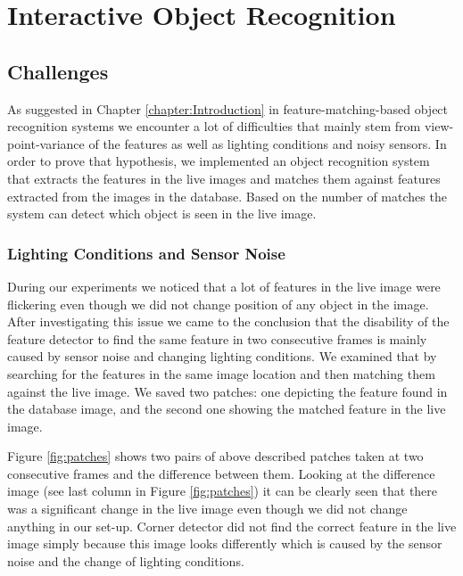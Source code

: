 \chapter{Interactive Object Recognition}
\label{chapter:Object Recognition}

\section{Challenges}
As suggested in Chapter \ref{chapter:Introduction} in feature-matching-based object recognition systems we encounter a lot of difficulties that mainly stem from view-point-variance of the features as well as lighting conditions and noisy sensors. In order to prove that hypothesis, we implemented an object recognition system that extracts the features in the  live images and matches them against features extracted from the images in the database. Based on the number of matches the system can detect which object is seen in the live image.

\subsection{Lighting Conditions and Sensor Noise}

During our experiments we noticed that a lot of features in the live image were flickering even though we did not change position of any object in the image. After investigating this issue we came to the conclusion that the disability of the feature detector to find the same feature in two consecutive frames is mainly caused by sensor noise and changing lighting conditions. We examined that by searching for the features in the same image location and then matching them against the live image. We saved two patches: one depicting the feature found in the database image, and the second one showing the matched feature in the live image.

Figure \ref{fig:patches} shows two pairs of above described patches taken at two consecutive frames and the difference between them. Looking at the difference image (see last column in Figure \ref{fig:patches}) it can be clearly seen that there was a significant change in the live image even though we did not change anything in our set-up. Corner detector did not find the correct feature in the live image simply because this image looks differently which is caused by the sensor noise and the change of lighting conditions.

